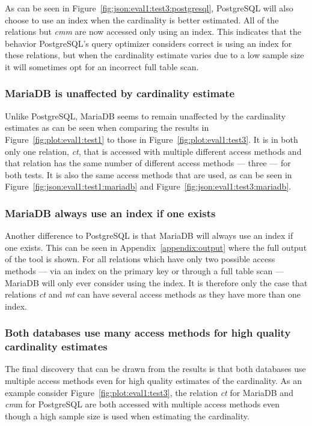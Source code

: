 As can be seen in Figure~\ref{fig:json:eval1:test3:postgresql}, PostgreSQL will also choose
to use an index when the cardinality is better estimated. All of the relations
but \textit{cmm} are now accessed only using an index. This indicates that the
behavior PostgreSQL's query optimizer considers correct is using an index for
these relations, but when the cardinality estimate varies due to a low sample
size it will sometimes opt for an incorrect full table scan.

\subsubsection{MariaDB is unaffected by cardinality estimate}
Unlike PostgreSQL, MariaDB seems to remain unaffected by the cardinality
estimates as can be seen when comparing the results in
Figure~\ref{fig:plot:eval1:test1} to those in Figure~\ref{fig:plot:eval1:test3}.
It is in both only one relation, \textit{ct}, that is accessed with multiple different
access methods and that relation has the same number of different access methods
--- three --- for both tests. It is also the same access methods that are used, as
can be seen in Figure~\ref{fig:json:eval1:test1:mariadb} and
Figure~\ref{fig:json:eval1:test3:mariadb}.

\subsubsection{MariaDB always use an index if one exists}
Another difference to PostgreSQL is that MariaDB will always use an index if one
exists. This can be seen in Appendix~\ref{appendix:output} where the full output
of the tool is shown. For all relations which have only two possible access
methods --- via an index on the primary key or through a full table scan ---
MariaDB will only ever consider using the index. It is therefore only the case
that relations \textit{ct} and \textit{mt} can have several access methods as
they have more than one index.

\subsubsection{Both databases use many access methods for high quality
  cardinality estimates}
The final discovery that can be drawn from the results is that both databases
use multiple access methods even for high quality estimates of the cardinality.
As an example consider Figure~\ref{fig:plot:eval1:test3}, the relation
\textit{ct} for MariaDB and \textit{cm}m for PostgreSQL are both accessed with
multiple access methods even though a high sample size is used when estimating
the cardinality.

